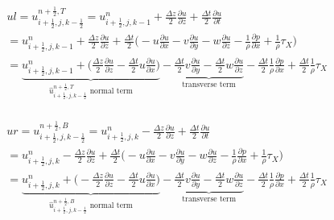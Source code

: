 \documentclass{article}
\numberwithin{equation}{subsection}
\begin{document}
\begin{align}
\begin{split}
& ul = u_{i+\frac{1}{2},j,k-\frac{1}{2}}^{n+\frac{1}{2},T} = u_{i+\frac{1}{2},j,k-1}^n + \frac{\Delta z}{2}\frac{\partial u}{\partial z} + \frac{\Delta t}{2}\frac{\partial u}{\partial t} \\
&= u_{i+\frac{1}{2},j,k-1}^n + \frac{\Delta z}{2} \frac{\partial u}{\partial z} + \frac{\Delta t}{2} \Big( -u\frac{\partial u}{\partial x} -v\frac{\partial u}{\partial y} -w\frac{\partial u}{\partial z} - \frac{1}{\rho}\frac{\partial p}{\partial x} +\frac{1}{\rho}\tau_X\Big) \\
&= \underbrace{u_{i+\frac{1}{2},j,k-1}^n + \Big(\frac{\Delta z}{2}\frac{\partial u}{\partial z} - \frac{\Delta t}{2} u\frac{\partial u}{\partial x}\Big)}_\text{$\widehat{u}_{i+\frac{1}{2},j,k-\frac{1}{2}}^{n+\frac{1}{2},T}$ normal term} -\underbrace{\frac{\Delta t}{2}v\frac{\partial u}{\partial y} - \frac{\Delta t}{2}w\frac{\partial u}{\partial z}}_\text{transverse term} - \frac{\Delta t}{2}\frac{1}{\rho}\frac{\partial p}{\partial x} + \frac{\Delta t}{2}\frac{1}{\rho}\tau_X
\end{split}
\end{align}

\begin{align}
\begin{split}
& ur = u_{i+\frac{1}{2},j,k-\frac{1}{2}}^{n+\frac{1}{2},B} = u_{i+\frac{1}{2},j,k}^n - \frac{\Delta z}{2}\frac{\partial u}{\partial z} + \frac{\Delta t}{2}\frac{\partial u}{\partial t} \\
&= u_{i+\frac{1}{2},j,k}^n - \frac{\Delta z}{2} \frac{\partial u}{\partial z} + \frac{\Delta t}{2} \Big( -u\frac{\partial u}{\partial x} -v\frac{\partial u}{\partial y} -w\frac{\partial u}{\partial z} - \frac{1}{\rho}\frac{\partial p}{\partial x} +\frac{1}{\rho}\tau_X\Big) \\
&= \underbrace{u_{i+\frac{1}{2},j,k}^n + \Big(-\frac{\Delta z}{2}\frac{\partial u}{\partial z} - \frac{\Delta t}{2} u\frac{\partial u}{\partial x}\Big)}_\text{$\widehat{u}_{i+\frac{1}{2},j,k-\frac{1}{2}}^{n+\frac{1}{2},B}$ normal term} -\underbrace{\frac{\Delta t}{2}v\frac{\partial u}{\partial y} - \frac{\Delta t}{2}w\frac{\partial u}{\partial z}}_\text{transverse term} - \frac{\Delta t}{2}\frac{1}{\rho}\frac{\partial p}{\partial x} + \frac{\Delta t}{2}\frac{1}{\rho}\tau_X
\end{split}
\end{align}
\end{document}
